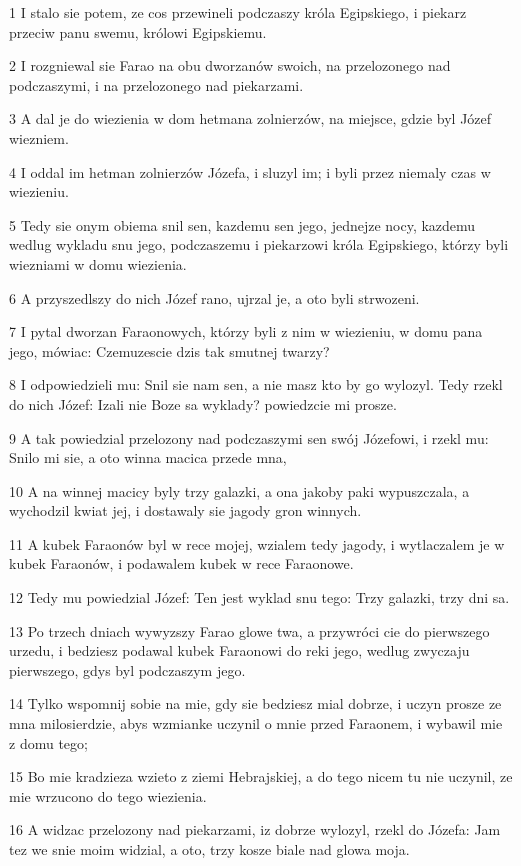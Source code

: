 \par 1 I stalo sie potem, ze cos przewineli podczaszy króla Egipskiego, i piekarz przeciw panu swemu, królowi Egipskiemu.
\par 2 I rozgniewal sie Farao na obu dworzanów swoich, na przelozonego nad podczaszymi, i na przelozonego nad piekarzami.
\par 3 A dal je do wiezienia w dom hetmana zolnierzów, na miejsce, gdzie byl Józef wiezniem.
\par 4 I oddal im hetman zolnierzów Józefa, i sluzyl im; i byli przez niemaly czas w wiezieniu.
\par 5 Tedy sie onym obiema snil sen, kazdemu sen jego, jednejze nocy, kazdemu wedlug wykladu snu jego, podczaszemu i piekarzowi króla Egipskiego, którzy byli wiezniami w domu wiezienia.
\par 6 A przyszedlszy do nich Józef rano, ujrzal je, a oto byli strwozeni.
\par 7 I pytal dworzan Faraonowych, którzy byli z nim w wiezieniu, w domu pana jego, mówiac: Czemuzescie dzis tak smutnej twarzy?
\par 8 I odpowiedzieli mu: Snil sie nam sen, a nie masz kto by go wylozyl. Tedy rzekl do nich Józef: Izali nie Boze sa wyklady? powiedzcie mi prosze.
\par 9 A tak powiedzial przelozony nad podczaszymi sen swój Józefowi, i rzekl mu: Snilo mi sie, a oto winna macica przede mna,
\par 10 A na winnej macicy byly trzy galazki, a ona jakoby paki wypuszczala, a wychodzil kwiat jej, i dostawaly sie jagody gron winnych.
\par 11 A kubek Faraonów byl w rece mojej, wzialem tedy jagody, i wytlaczalem je w kubek Faraonów, i podawalem kubek w rece Faraonowe.
\par 12 Tedy mu powiedzial Józef: Ten jest wyklad snu tego: Trzy galazki, trzy dni sa.
\par 13 Po trzech dniach wywyzszy Farao glowe twa, a przywróci cie do pierwszego urzedu, i bedziesz podawal kubek Faraonowi do reki jego, wedlug zwyczaju pierwszego, gdys byl podczaszym jego.
\par 14 Tylko wspomnij sobie na mie, gdy sie bedziesz mial dobrze, i uczyn prosze ze mna milosierdzie, abys wzmianke uczynil o mnie przed Faraonem, i wybawil mie z domu tego;
\par 15 Bo mie kradzieza wzieto z ziemi Hebrajskiej, a do tego nicem tu nie uczynil, ze mie wrzucono do tego wiezienia.
\par 16 A widzac przelozony nad piekarzami, iz dobrze wylozyl, rzekl do Józefa: Jam tez we snie moim widzial, a oto, trzy kosze biale nad glowa moja.
